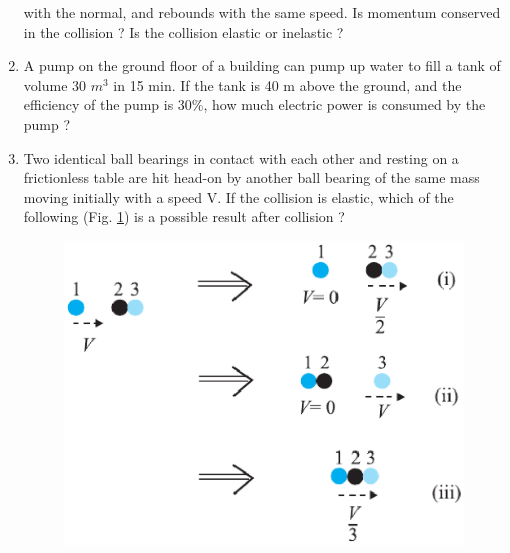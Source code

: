\begin{enumerate}[label=\arabic*.,ref=\thesection.\theenumi]
with the normal, and rebounds with the same speed. Is momentum conserved in the collision ? Is the collision elastic or inelastic ?
\item A pump on the ground floor of a building can pump up water to fill a tank of volume 30 $m^3$ in 15 min. If the tank is 40 m above the ground, and the efficiency of the pump is 30\%, how much electric power is consumed by the pump ?
\item Two identical ball bearings in contact with each other and resting on a frictionless table are hit head-on by another ball bearing of the same mass moving initially with a speed V. If the collision is elastic, which of the following (Fig. \ref{fig:6.14}) is a possible result after collision ?
\begin{figure}[!ht]
\centering
\includegraphics[width=\columnwidth]{./figs/11-1/6/6.14.eps}
\caption{}
\label{fig:6.14}
\end{figure} 
\end{enumerate}
